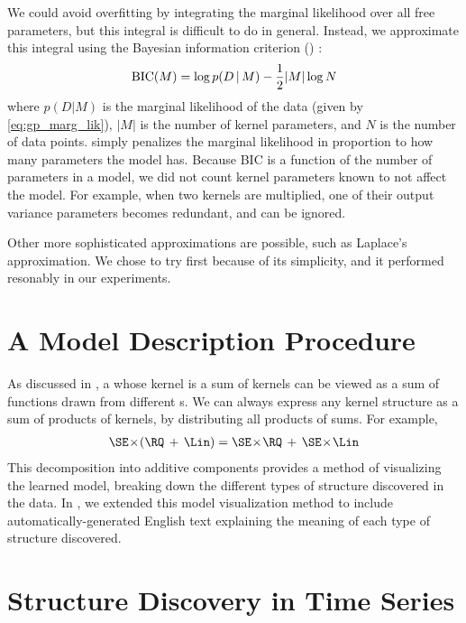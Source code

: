We could avoid overfitting by integrating the marginal likelihood over all free parameters, but this integral is difficult to do in general.
Instead, we approximate this integral using the Bayesian information criterion (\BIC{}) \citep{schwarz1978estimating}:
%
\begin{equation}
\textrm{BIC}(M) = \log p(D \,|\, M) - \frac{1}{2} |M| \log N
\end{equation}
%
where $p(D|M)$ is the marginal likelihood of the data (given by \cref{eq:gp_marg_lik}), $|M|$ is the number of kernel parameters, and $N$ is the number of data points.
\BIC{} simply penalizes the marginal likelihood in proportion to how many parameters the model has.
Because BIC is a function of the number of parameters in a model, we did not count kernel parameters known to not affect the model.
For example, when two kernels are multiplied, one of their output variance parameters becomes redundant, and can be ignored.

Other more sophisticated approximations are possible, such as Laplace's approximation.
We chose to try \BIC{} first because of its simplicity, and it performed resonably in our experiments.




\section{A Model Description Procedure}

As discussed in , a \gp{} whose kernel is a sum of kernels can be viewed as a sum of functions drawn from different \gp{}s.
We can always express any kernel structure as a sum of products of kernels, by distributing all products of sums.
For example,
%
\begin{align}
\SE \kerntimes (\RQ \kernplus \Lin) = \SE \kerntimes  \RQ \kernplus \SE \kerntimes \Lin
\end{align}
%
This decomposition into additive components provides a method of visualizing the learned model, breaking down the different types of structure discovered in the data.
In \citep{LloDuvGroetal14}, we extended this model visualization method to include automatically-generated English text explaining the meaning of each type of structure discovered.



\section{Structure Discovery in Time Series}
\label{sec:time_series}

